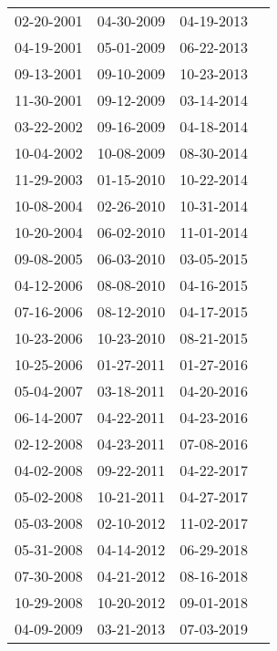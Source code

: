 \begin{supertabular}{llll}
 02-20-2001 &  04-30-2009 &  04-19-2013 \\
 04-19-2001 &  05-01-2009 &  06-22-2013 \\
 09-13-2001 &  09-10-2009 &  10-23-2013 \\
 11-30-2001 &  09-12-2009 &  03-14-2014 \\
 03-22-2002 &  09-16-2009 &  04-18-2014 \\
 10-04-2002 &  10-08-2009 &  08-30-2014 \\
 11-29-2003 &  01-15-2010 &  10-22-2014 \\
 10-08-2004 &  02-26-2010 &  10-31-2014 \\
 10-20-2004 &  06-02-2010 &  11-01-2014 \\
 09-08-2005 &  06-03-2010 &  03-05-2015 \\
 04-12-2006 &  08-08-2010 &  04-16-2015 \\
 07-16-2006 &  08-12-2010 &  04-17-2015 \\
 10-23-2006 &  10-23-2010 &  08-21-2015 \\
 10-25-2006 &  01-27-2011 &  01-27-2016 \\
 05-04-2007 &  03-18-2011 &  04-20-2016 \\
 06-14-2007 &  04-22-2011 &  04-23-2016 \\
 02-12-2008 &  04-23-2011 &  07-08-2016 \\
 04-02-2008 &  09-22-2011 &  04-22-2017 \\
 05-02-2008 &  10-21-2011 &  04-27-2017 \\
 05-03-2008 &  02-10-2012 &  11-02-2017 \\
 05-31-2008 &  04-14-2012 &  06-29-2018 \\
 07-30-2008 &  04-21-2012 &  08-16-2018 \\
 10-29-2008 &  10-20-2012 &  09-01-2018 \\
 04-09-2009 &  03-21-2013 &  07-03-2019 \\
\end{supertabular}
